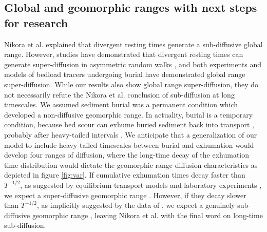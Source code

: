 \subsection{Global and geomorphic ranges with next steps for research}

Nikora et al. explained that divergent resting times generate a sub-diffusive global range.
However, studies have demonstrated that divergent resting times can generate super-diffusion in asymmetric random walks \citep{Weeks1996,Weeks1998}, and both experiments \citep{Bradley2017,Bradley2010} and models \citep{Pelosi2016,Wu2019,Wu2019a} of bedload tracers undergoing burial have demonstrated global range super-diffusion.
While our results also show global range super-diffusion, they do not necessarily refute the Nikora et al. conclusion of sub-diffusion at long timescales.
We assumed sediment burial was a permanent condition which developed a non-diffusive geomorphic range.
In actuality, burial is a temporary condition, because bed scour can exhume buried sediment back into transport \citep{Wu2019a}, probably after heavy-tailed intervals \citep{Voepel2013,Martin2014,Pierce2020}.
We anticipate that a generalization of our model to include heavy-tailed timescales between burial and exhumation would develop four ranges of diffusion, where the long-time decay of the exhumation time distribution would dictate the geomorphic range diffusion characteristics as depicted in figure \ref{fig:var}.
If cumulative exhumation times decay faster than $T^{-1/2}$, as suggested by equilibrium transport models \citep{Voepel2013, Martin2014, Pierce2020a} and laboratory experiments \citep{Martin2014,Martin2012}, we expect a super-diffusive geomorphic range \citep{Weeks1998}.
However, if they decay slower than $T^{-1/2}$, as implicitly suggested by the data of \citet{Olinde2015}, we expect a genuinely sub-diffusive geomorphic range \citep{Weeks1998}, leaving Nikora et al. with the final word on long-time sub-diffusion.

